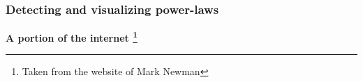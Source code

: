 \documentclass{beamer}
\begin{document}
%    
\begin{frame}
    \frametitle{Detecting and visualizing power-laws}
    \centering
    {\bf A portion of the internet \footnote{Taken from the website of Mark Newman}}


\end{frame}
\end{document}
